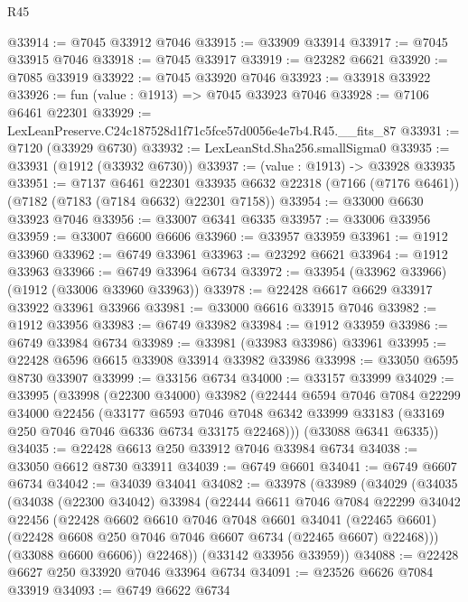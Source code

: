 \begin{lexlean}{R45}
\begin{coremodule}
{@33914 := @7045 @33912 @7046
@33915 := @33909 @33914
@33917 := @7045 @33915 @7046
@33918 := @7045 @33917
@33919 := @23282 @6621
@33920 := @7085 @33919
@33922 := @7045 @33920 @7046
@33923 := @33918 @33922
@33926 := fun (value : @1913) => @7045 @33923 @7046
@33928 := @7106 @6461 @22301
@33929 := LexLeanPreserve.C24c187528d1f71c5fce57d0056e4e7b4.R45.__fits_87
@33931 := @7120 (@33929 @6730)
@33932 := LexLeanStd.Sha256.smallSigma0
@33935 := @33931 (@1912 (@33932 @6730))
@33937 := (value : @1913) -> @33928 @33935
@33951 := @7137
    @6461
    @22301
    @33935
    @6632
    @22318
    (@7166 (@7176 @6461))
    (@7182 (@7183 (@7184 @6632) @22301 @7158))
@33954 := @33000 @6630 @33923 @7046
@33956 := @33007 @6341 @6335
@33957 := @33006 @33956
@33959 := @33007 @6600 @6606
@33960 := @33957 @33959
@33961 := @1912 @33960
@33962 := @6749 @33961
@33963 := @23292 @6621
@33964 := @1912 @33963
@33966 := @6749 @33964 @6734
@33972 := @33954 (@33962 @33966) (@1912 (@33006 @33960 @33963))
@33978 := @22428 @6617 @6629 @33917 @33922 @33961 @33966
@33981 := @33000 @6616 @33915 @7046
@33982 := @1912 @33956
@33983 := @6749 @33982
@33984 := @1912 @33959
@33986 := @6749 @33984 @6734
@33989 := @33981 (@33983 @33986) @33961
@33995 := @22428 @6596 @6615 @33908 @33914 @33982 @33986
@33998 := @33050 @6595 @8730 @33907
@33999 := @33156 @6734
@34000 := @33157 @33999
@34029 := @33995
    (@33998
      (@22300 @34000)
      @33982
      (@22444
        @6594
        @7046
        @7084
        @22299
        @34000
        @22456
        (@33177
          @6593
          @7046
          @7048
          @6342
          @33999
          @33183
          (@33169 @250 @7046 @7046 @6336 @6734 @33175 @22468)))
      (@33088 @6341 @6335))
@34035 := @22428 @6613 @250 @33912 @7046 @33984 @6734
@34038 := @33050 @6612 @8730 @33911
@34039 := @6749 @6601
@34041 := @6749 @6607 @6734
@34042 := @34039 @34041
@34082 := @33978
    (@33989
      (@34029
        (@34035
          (@34038
            (@22300 @34042)
            @33984
            (@22444
              @6611
              @7046
              @7084
              @22299
              @34042
              @22456
              (@22428
                @6602
                @6610
                @7046
                @7048
                @6601
                @34041
                (@22465 @6601)
                (@22428 @6608 @250 @7046 @7046 @6607 @6734 (@22465 @6607) @22468)))
            (@33088 @6600 @6606))
          @22468))
      (@33142 @33956 @33959))
@34088 := @22428 @6627 @250 @33920 @7046 @33964 @6734
@34091 := @23526 @6626 @7084 @33919
@34093 := @6749 @6622 @6734
}
\end{coremodule}
\end{lexlean}
